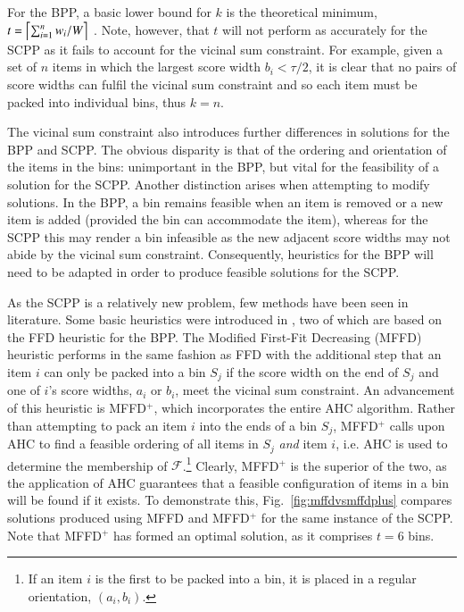 \documentclass[a4paper,11pt,authoryear]{elsarticle}
\begin{document}
For the BPP, a basic lower bound for $k$ is the theoretical minimum, $t = \ceil*{\sum_{i=1}^{n} w_i / W}$ \cite{martello1990l}. Note, however, that $t$ will not perform as accurately for the SCPP as it fails to account for the vicinal sum constraint. For example, given a set of $n$ items in which the largest score width $b_i < \tau / 2$, it is clear that no pairs of score widths can fulfil the vicinal sum constraint and so each item must be packed into individual bins, thus $k = n$.

The vicinal sum constraint also introduces further differences in solutions for the BPP and SCPP. The obvious disparity is that of the ordering and orientation of the items in the bins: unimportant in the BPP, but vital for the feasibility of a solution for the SCPP. Another distinction arises when attempting to modify solutions. In the BPP, a bin remains feasible when an item is removed or a new item is added (provided the bin can accommodate the item), whereas for the SCPP this may render a bin infeasible as the new adjacent score widths may not abide by the vicinal sum constraint. Consequently, heuristics for the BPP will need to be adapted in order to produce feasible solutions for the SCPP.

As the SCPP is a relatively new problem, few methods have been seen in literature. Some basic heuristics were introduced in \cite{hawa2018}, two of which are based on the FFD heuristic for the BPP. The Modified First-Fit Decreasing (MFFD) heuristic performs in the same fashion as FFD with the additional step that an item $i$ can only be packed into a bin $S_j$ if the score width on the end of $S_j$ and one of $i$'s score widths, $a_i$ or $b_i$, meet the vicinal sum constraint. An advancement of this heuristic is MFFD$^+$, which incorporates the entire AHC algorithm. Rather than attempting to pack an item $i$ into the ends of a bin $S_j$, MFFD$^+$ calls upon AHC to find a feasible ordering of all items in $S_j$ \emph{and} item $i$, i.e. AHC is used to determine the membership of $\mathcal{F}$.\footnote{If an item $i$ is the first to be packed into a bin, it is placed in a regular orientation, $(a_i, b_i)$.} Clearly, MFFD$^+$ is the superior of the two, as the application of AHC guarantees that a feasible configuration of items in a bin will be found if it exists. To demonstrate this, Fig.~\ref{fig:mffdvsmffdplus} compares solutions produced using MFFD and MFFD$^+$ for the same instance of the SCPP. Note that MFFD$^+$ has formed an optimal solution, as it comprises $t = 6$ bins.
\end{document}
